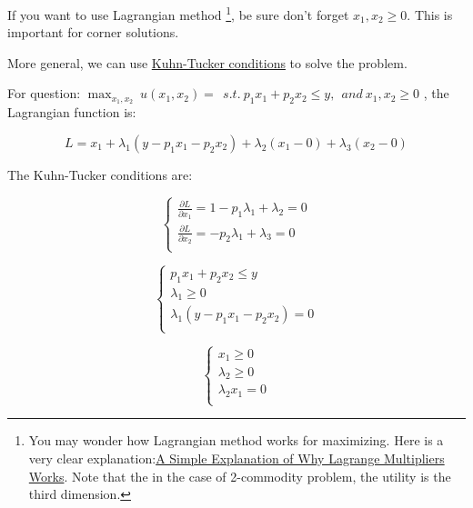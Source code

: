 \documentclass{article}
\begin{document}
\begin{mdframed}[backgroundcolor=blue!20,linecolor=white]

If you want to use Lagrangian method \footnote{You may wonder how Lagrangian method works for maximizing. Here is a very clear explanation:\href{https://medium.com/@andrew.chamberlain/a-simple-explanation-of-why-lagrange-multipliers-works-253e2cdcbf74\#:~:text=That\%20means\%20they're\%20parallel\%20and\%20point\%20in\%20the\%20same\%20direction.\&text=So\%20the\%20bottom\%20line\%20is,while\%20also\%20satisfying\%20those\%20constraints}{A Simple Explanation of Why Lagrange Multipliers Works}. Note that the in the case of 2-commodity problem, the utility is the third dimension.}, be sure don't forget $x_1, x_2 \ge 0$.
This is important for corner solutions.

More general, we can use \href{https://mjo.osborne.economics.utoronto.ca/index.php/tutorial/index/1/ktc/t}{Kuhn-Tucker conditions} to solve the problem.

For question: $\max_{x_1,x_2} \ u(x_1,x_2) =  \ \ s.t. \ p_1x_1 + p_2x_2 \le y,
\ \ and \ x_1, x_2 \ge 0 $ , the Lagrangian function is:

$$L = x_1 + \lambda_1(y - p_1x_1 - p_2x_2) + \lambda_2(x_1-0)+ \lambda_3(x_2-0)$$

The Kuhn-Tucker conditions are:

\begin{equation}
  \begin{cases}
    \frac{\partial L}{\partial x_1} = 1-p_1\lambda_1 + \lambda_2 =0 \\
    \frac{\partial L}{\partial x_2} = -p_2\lambda_1 + \lambda_3 =0 \\
  \end{cases}
  \label{eq:L1}
\end{equation}

\begin{equation}
  \begin{cases}
    p_1x_1 + p_2x_2 \le y \\
    \lambda_1 \ge 0 \\
    \lambda_1(y - p_1x_1 - p_2x_2) =0 \\
  \end{cases}
   \label{eq:L2}
\end{equation}

\begin{equation}
  \begin{cases}
    x_1 \ge 0 \\
    \lambda_2 \ge 0 \\
    \lambda_2 x_1 =0 \\
  \end{cases}
   \label{eq:L3}
\end{equation}


\end{mdframed}
\end{document}
